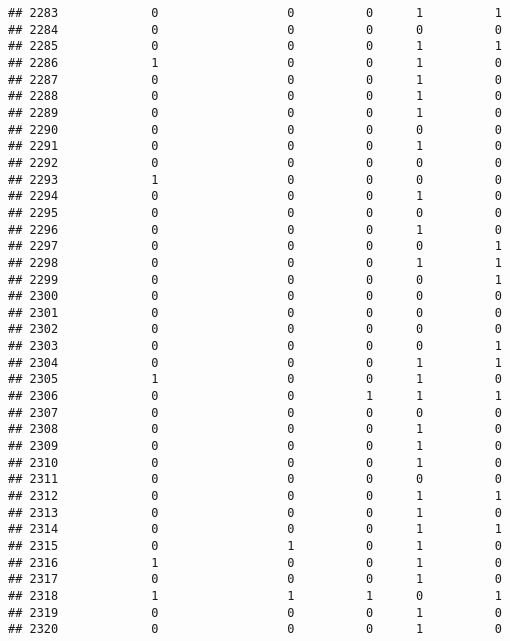 \documentclass[
]{article}
\begin{document}
\begin{verbatim}
## 2283             0                  0          0      1          1
## 2284             0                  0          0      0          0
## 2285             0                  0          0      1          1
## 2286             1                  0          0      1          0
## 2287             0                  0          0      1          0
## 2288             0                  0          0      1          0
## 2289             0                  0          0      1          0
## 2290             0                  0          0      0          0
## 2291             0                  0          0      1          0
## 2292             0                  0          0      0          0
## 2293             1                  0          0      0          0
## 2294             0                  0          0      1          0
## 2295             0                  0          0      0          0
## 2296             0                  0          0      1          0
## 2297             0                  0          0      0          1
## 2298             0                  0          0      1          1
## 2299             0                  0          0      0          1
## 2300             0                  0          0      0          0
## 2301             0                  0          0      0          0
## 2302             0                  0          0      0          0
## 2303             0                  0          0      0          1
## 2304             0                  0          0      1          1
## 2305             1                  0          0      1          0
## 2306             0                  0          1      1          1
## 2307             0                  0          0      0          0
## 2308             0                  0          0      1          0
## 2309             0                  0          0      1          0
## 2310             0                  0          0      1          0
## 2311             0                  0          0      0          0
## 2312             0                  0          0      1          1
## 2313             0                  0          0      1          0
## 2314             0                  0          0      1          1
## 2315             0                  1          0      1          0
## 2316             1                  0          0      1          0
## 2317             0                  0          0      1          0
## 2318             1                  1          1      0          1
## 2319             0                  0          0      1          0
## 2320             0                  0          0      1          0

\end{verbatim}
\end{document}
